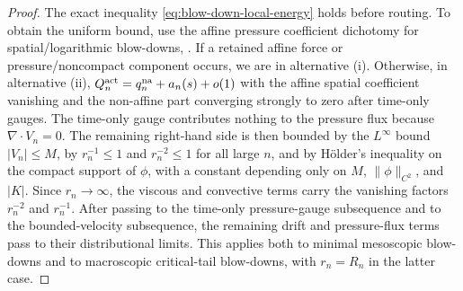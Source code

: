 \documentclass[11pt]{amsart}
\numberwithin{equation}{section}
\theoremstyle{plain}
\theoremstyle{definition}
\theoremstyle{remark}
\begin{document}
\begin{proof}
The exact inequality \eqref{eq:blow-down-local-energy} holds before routing.  To
obtain the uniform bound, use the affine pressure coefficient dichotomy for
spatial/logarithmic blow-downs,
.  If a retained affine
force or pressure/noncompact component occurs, we are in alternative
\textup{(i)}.  Otherwise, in alternative \textup{(ii)},
\(Q_n^{\rm act}=q_n^{\rm na}+a_n(s)+o(1)\) with the affine spatial coefficient
vanishing and the non-affine part converging strongly to zero after time-only
gauges.  The time-only gauge contributes nothing to the pressure flux because
\(\nabla\cdot V_n=0\).  The remaining right-hand side is then bounded by the
\(L^\infty\) bound \(|V_n|\le M\), by \(r_n^{-1}\le1\) and \(r_n^{-2}\le1\) for
all large \(n\), and by H\"older's inequality on the compact support of \(\phi\),
with a constant depending only on \(M\), \(\|\phi\|_{C^2}\), and \(|K|\).  Since
\(r_n\to\infty\), the viscous and convective terms carry the vanishing factors
\(r_n^{-2}\) and \(r_n^{-1}\).  After passing to the time-only pressure-gauge
subsequence and to the bounded-velocity subsequence, the remaining drift and
pressure-flux terms pass to their distributional limits.  This applies both to
minimal mesoscopic blow-downs and to macroscopic critical-tail blow-downs, with
\(r_n=R_n\) in the latter case.
\end{proof}
\end{document}
